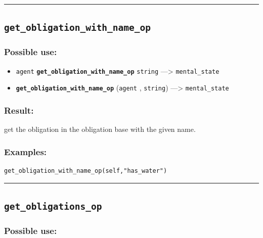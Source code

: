 \documentclass[]{book}
\providecommand{\tightlist}{%
  \setlength{\itemsep}{0pt}\setlength{\parskip}{0pt}}
\theoremstyle{definition}
\theoremstyle{definition}
\theoremstyle{definition}
\theoremstyle{remark}
\begin{document}
\begin{center}\rule{0.5\linewidth}{\linethickness}\end{center}

\subsection{\texorpdfstring{\texttt{get\_obligation\_with\_name\_op}}{get\_obligation\_with\_name\_op}}\label{get_obligation_with_name_op}

\subsubsection{Possible use:}\label{possible-use-222}

\begin{itemize}
\tightlist
\item
  \texttt{agent} \textbf{\texttt{get\_obligation\_with\_name\_op}}
  \texttt{string} ---\textgreater{} \texttt{mental\_state}
\item
  \textbf{\texttt{get\_obligation\_with\_name\_op}} (\texttt{agent} ,
  \texttt{string}) ---\textgreater{} \texttt{mental\_state}
\end{itemize}

\subsubsection{Result:}\label{result-216}

get the obligation in the obligation base with the given name.

\subsubsection{Examples:}\label{examples-169}

\begin{verbatim}
get_obligation_with_name_op(self,"has_water") 
\end{verbatim}

\begin{center}\rule{0.5\linewidth}{\linethickness}\end{center}

\subsection{\texorpdfstring{\texttt{get\_obligations\_op}}{get\_obligations\_op}}\label{get_obligations_op}

\subsubsection{Possible use:}\label{possible-use-223}
\end{document}
